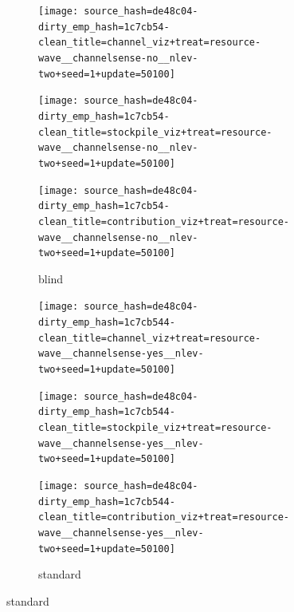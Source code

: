 \begin{figure}[!htbp]
\begin{center}
\begin{subfigure}[b]{\textwidth}
  \begin{minipage}{0.2\textwidth}
  \texttt{[image: source\_hash=de48c04-dirty\_emp\_hash=1c7cb54-clean\_title=channel\_viz+treat=resource-wave\_\_channelsense-no\_\_nlev-two+seed=1+update=50100]}
  \end{minipage}
  \begin{minipage}{0.2\textwidth}
  \texttt{[image: source\_hash=de48c04-dirty\_emp\_hash=1c7cb54-clean\_title=stockpile\_viz+treat=resource-wave\_\_channelsense-no\_\_nlev-two+seed=1+update=50100]}
  \end{minipage}
  \begin{minipage}{0.2\textwidth}
  \texttt{[image: source\_hash=de48c04-dirty\_emp\_hash=1c7cb54-clean\_title=contribution\_viz+treat=resource-wave\_\_channelsense-no\_\_nlev-two+seed=1+update=50100]}
  \end{minipage}
  \begin{minipage}{0.2\textwidth}
  \caption{
  blind
  }
  \label{fig:TODO}
  \end{minipage}
\end{subfigure}

\begin{subfigure}[b]{\textwidth}
  \begin{minipage}{0.2\textwidth}
  \texttt{[image: source\_hash=de48c04-dirty\_emp\_hash=1c7cb544-clean\_title=channel\_viz+treat=resource-wave\_\_channelsense-yes\_\_nlev-two+seed=1+update=50100]}
  \end{minipage}
  \begin{minipage}{0.2\textwidth}
  \texttt{[image: source\_hash=de48c04-dirty\_emp\_hash=1c7cb544-clean\_title=stockpile\_viz+treat=resource-wave\_\_channelsense-yes\_\_nlev-two+seed=1+update=50100]}
  \end{minipage}
  \begin{minipage}{0.2\textwidth}
  \texttt{[image: source\_hash=de48c04-dirty\_emp\_hash=1c7cb544-clean\_title=contribution\_viz+treat=resource-wave\_\_channelsense-yes\_\_nlev-two+seed=1+update=50100]}
  \end{minipage}
  \begin{minipage}{0.2\textwidth}
  \caption{
  standard
  }
  \label{fig:TODO}
  \end{minipage}
\end{subfigure}


\end{center}
\end{figure}
